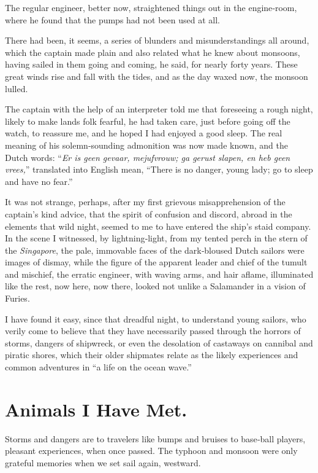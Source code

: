 \documentclass[12pt]{book}
\begin{document}
The regular engineer, better now, straightened things out in the engine‐room,
where he found that the pumps had not been used at all.

There had been, it seems, a series of blunders and misunderstandings all
around, which the captain made plain and also related what he knew about
monsoons, having sailed in them going and coming, he said, for nearly forty
years. These great winds rise and fall with the tides, and as the day waxed now,
the monsoon lulled.

The captain with the help of an interpreter told me that foreseeing a rough
night, likely to make lands folk fearful, he had taken care, just before going off the
watch, to reassure me, and he hoped I had enjoyed a good sleep. The real meaning
of his solemn‐sounding admonition was now made known, and the Dutch words:
“{\it Er is geen gevaar, mejufvrouw; ga gerust slapen, en heb geen vrees,}” translated into
English mean, “There is no danger, young lady; go to sleep and have no fear.”

It was not strange, perhaps, after my first grievous misapprehension of the
captain’s kind advice, that the spirit of confusion and discord, abroad in the
elements that wild night, seemed to me to have entered the ship’s staid company.
In the scene I witnessed, by lightning‐light, from my tented perch in the stern of
the {\it Singapore}, the pale, immovable faces of the dark‐bloused Dutch sailors were
images of dismay, while the figure of the apparent leader and chief of the tumult
and mischief, the erratic engineer, with waving arms, and hair aflame, illuminated
like the rest, now here, now there, looked not unlike a Salamander in a vision of
Furies.

I have found it easy, since that dreadful night, to understand young sailors,
who verily come to believe that they have necessarily passed through the horrors
of storms, dangers of shipwreck, or even the desolation of castaways on cannibal
and piratic shores, which their older shipmates relate as the likely experiences
and common adventures in “a life on the ocean wave.”

\chapter{Animals I Have Met.}

Storms and dangers are to travelers like bumps and bruises to base‐ball players,
pleasant experiences, when once passed. The typhoon and monsoon were only
grateful memories when we set sail again, westward.
\end{document}

